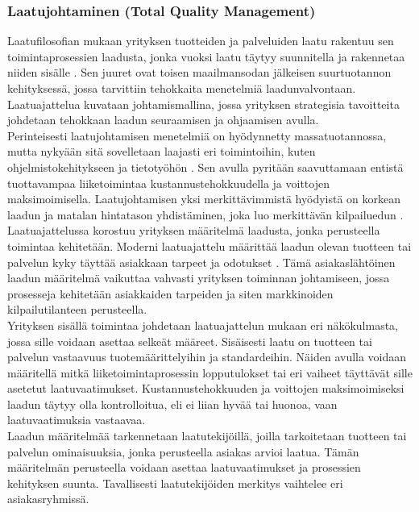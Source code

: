 \documentclass[finnish,12pt,a4paper,pdftex]{article}
\begin{document}
\subsubsection{Laatujohtaminen (Total Quality Management)}

Laatufilosofian mukaan yrityksen tuotteiden ja palveluiden laatu rakentuu sen toimintaprosessien laadusta, jonka vuoksi laatu täytyy suunnitella ja rakennetaa niiden sisälle \citep{teollisuustalous}. Sen juuret ovat toisen maailmansodan jälkeisen suurtuotannon kehityksessä, jossa tarvittiin tehokkaita menetelmiä laadunvalvontaan. Laatuajattelua kuvataan johtamismallina, jossa yrityksen strategisia tavoitteita johdetaan tehokkaan laadun seuraamisen ja ohjaamisen avulla. \\

Perinteisesti laatujohtamisen menetelmiä on hyödynnetty massatuotannossa, mutta nykyään sitä sovelletaan laajasti eri toimintoihin, kuten ohjelmistokehitykseen ja tietotyöhön \citep{ohjelmistotuotanto}. Sen avulla pyritään saavuttamaan entistä tuottavampaa liiketoimintaa kustannustehokkuudella ja voittojen maksimoimisella. Laatujohtamisen yksi merkittävimmistä hyödyistä on korkean laadun ja matalan hintatason yhdistäminen, joka luo merkittävän kilpailuedun \citep{teollisuustalous}.\\

Laatuajattelussa korostuu yrityksen määritelmä laadusta, jonka perusteella toimintaa kehitetään. Moderni laatuajattelu määrittää laadun olevan tuotteen tai palvelun kyky täyttää asiakkaan tarpeet ja odotukset \citep{teollisuustalous}. Tämä asiakaslähtöinen laadun määritelmä vaikuttaa vahvasti yrityksen toiminnan johtamiseen, jossa prosesseja kehitetään asiakkaiden tarpeiden ja siten markkinoiden kilpailutilanteen perusteella.\\

Yrityksen sisällä toimintaa johdetaan laatuajattelun mukaan eri näkökulmasta, jossa sille voidaan asettaa selkeät määreet. Sisäisesti laatu on tuotteen tai palvelun vastaavuus tuotemäärittelyihin ja standardeihin. Näiden avulla voidaan määritellä mitkä liiketoimintaprosessin lopputulokset tai eri vaiheet täyttävät sille asetetut laatuvaatimukset. Kustannustehokkuuden ja voittojen maksimoimiseksi laadun täytyy olla kontrolloitua, eli ei liian hyvää tai huonoa, vaan laatuvaatimuksia vastaavaa. \citep{teollisuustalous}\\

Laadun määritelmää tarkennetaan laatutekijöillä, joilla tarkoitetaan tuotteen tai palvelun ominaisuuksia, jonka perusteella asiakas arvioi laatua. Tämän määritelmän perusteella voidaan asettaa laatuvaatimukset ja prosessien kehityksen suunta. Tavallisesti laatutekijöiden merkitys vaihtelee eri asiakasryhmissä. \citep{teollisuustalous}\\
\end{document}
